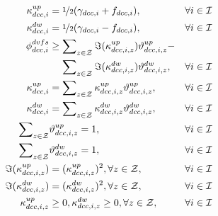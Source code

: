 \documentclass[lettersize,journal]{IEEEtran}
\begin{document}
\vspace{-0.25cm}
\begin{subequations}
\begin{align}
\kappa_{dcc,i}^{up} &= \nicefrac{1}{2}(\gamma_{dcc,i} + f_{dcc,i}), &&\forall i\in\mathcal{I}\\
\kappa_{dcc,i}^{dw} &= \nicefrac{1}{2}(\gamma_{dcc,i} - f_{dcc,i}), &&\forall i\in\mathcal{I}\\
\phi_{dcc,i}^{dvfs} &\geq \sum\nolimits_{z\in\mathcal{Z}} \Im(\kappa_{dcc,i,z}^{up})\vartheta_{dcc,i,z}^{up} -&& \\
&\quad\, \sum\nolimits_{z\in\mathcal{Z}} \Im(\kappa_{dcc,i,z}^{dw})\vartheta_{dcc,i,z}^{dw},&&\forall i\in\mathcal{I}\\
\kappa_{dcc,i}^{up} &= \sum\nolimits_{z\in\mathcal{Z}} \kappa_{dcc,i,z}^{up}\vartheta_{dcc,i,z}^{up},&&\forall i\in\mathcal{I}\\
\kappa_{dcc,i}^{dw} &= \sum\nolimits_{z\in\mathcal{Z}} \kappa_{dcc,i,z}^{dw}\vartheta_{dcc,i,z}^{dw},&&\forall i\in\mathcal{I}\\
\sum\nolimits_{z\in\mathcal{Z}} &\vartheta_{dcc,i,z}^{up} = 1, &&\forall i\in\mathcal{I}\\
\sum\nolimits_{z\in\mathcal{Z}} &\vartheta_{dcc,i,z}^{dw} = 1, &&\forall i\in\mathcal{I}\\
\Im(\kappa_{dcc,i,z}^{up}) &= (\kappa_{dcc,i,z}^{up})^2, \forall z\in\mathcal{Z}, &&\forall i\in\mathcal{I}\\
\Im(\kappa_{dcc,i,z}^{dw}) &= (\kappa_{dcc,i,z}^{dw})^2, \forall z\in\mathcal{Z}, &&\forall i\in\mathcal{I}\\
\kappa_{dcc,i,z}^{up} &\geq 0, \kappa_{dcc,i,z}^{dw} \geq 0,\forall z\in\mathcal{Z}, &&\forall i\in\mathcal{I}
\end{align}
\end{subequations}





\end{document}
